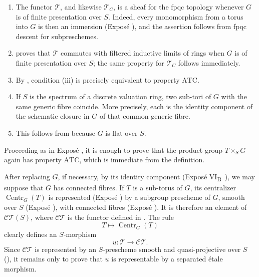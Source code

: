 \begin{enumerate}
\renewcommand{\labelenumi}{\textup{\roman{enumi})}}
\item The functor \(\mathcal T\), and likewise \(\mathcal T_C\), is
a sheaf for the fpqc topology whenever \(G\) is of finite
presentation over \(S\). Indeed, every monomorphism from a torus
into \(G\) is then an immersion (Exposé ), and the assertion
follows from fpqc descent for subpreschemes.

\item {} proves that \(\mathcal T\) commutes with filtered
inductive limits of rings when \(G\) is of finite presentation over
\(S\); the same property for \(\mathcal T_C\) follows immediately.

\item By , condition \textup{(iii)} is precisely
equivalent to property \(\mathrm{ATC}\).

\item If \(S\) is the spectrum of a discrete valuation ring, two
sub-tori of \(G\) with the same generic fibre coincide. More
precisely, each is the identity component of the schematic closure
in \(G\) of that common generic fibre.

\item This follows from  because \(G\) is flat over
\(S\).
\end{enumerate}

Proceeding as in Exposé , it is enough to prove that the
product group \(T\times_S G\) again has property
\(\mathrm{ATC}\), which is immediate from the definition.

After replacing \(G\), if necessary, by its identity component
(Exposé VI\textsubscript{B}~), we may suppose that \(G\) has
connected fibres. If \(T\) is a sub-torus of \(G\), its centralizer
\(\operatorname{Centr}_G(T)\) is represented (Exposé ) by a
subgroup prescheme of \(G\), smooth over \(S\)
(Exposé ), with connected fibres
(Exposé ). It is therefore an element of
\(\mathcal{CT}(S)\), where \(\mathcal{CT}\) is the functor defined
in . The rule
\[
  T\longmapsto\operatorname{Centr}_G(T)
\]
clearly defines an \(S\)-morphism
\[
  u:\mathcal T\longrightarrow\mathcal{CT}.
\]
Since \(\mathcal{CT}\) is represented by an \(S\)-prescheme smooth
and quasi-projective over \(S\) (), it remains only to prove
that \(u\) is representable by a separated étale morphism.

